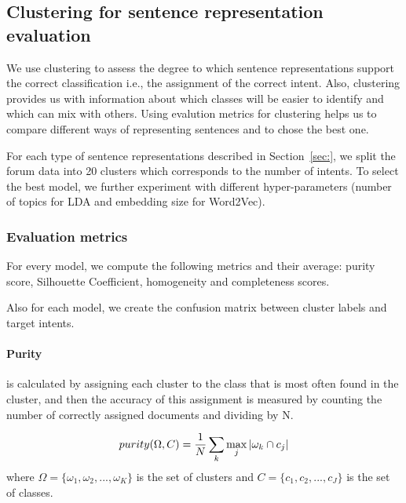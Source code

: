 \documentclass[11pt]{article}
\begin{document}
\subsection{Clustering for sentence representation evaluation}
\label{subsec:clustering2}

We use clustering to assess the degree to which sentence representations support the correct classification i.e., the assignment of the correct intent. Also, clustering provides us with information about which classes will be easier to identify and which can mix with others. Using evalution metrics for clustering helps us to compare different ways of representing sentences and to chose the best one.

For each type of sentence representations described in
Section~\ref{sec:}, we split the forum data  into 20 clusters
which corresponds to the number of intents. To select the best model,
we further experiment with different hyper-parameters (number of topics for
LDA and embedding size for Word2Vec).

\subsubsection{Evaluation metrics}

For every model, we compute the following metrics and their average:
purity score, Silhouette Coefficient, homogeneity and completeness
scores.

Also for each model, we create the confusion matrix between cluster labels and target intents.

\paragraph{Purity} is calculated by assigning each cluster to the class that is most often found in the cluster, and then the accuracy of this assignment is measured by counting the number of correctly assigned documents and dividing by N.

\begin{equation}
\centering
purity(\Omega,C) =\frac{1}{N} \sum_{k} \max_{j}|\omega_{k}\cap c_{j}|
\end{equation}
where $\Omega=\{\omega_{1}, \omega_{2}, ... ,\omega_{K}\}$ is the set of clusters and $C = \{c_{1}, c_{2}, ... , c_{J}\}$ is the set of classes. 
\end{document}
